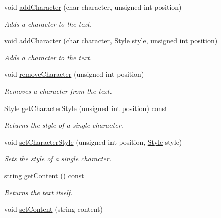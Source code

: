 \begin{CompactItemize}
void \hyperlink{class_text_8e2f98d018b51a0b800bb1189ad7d9ae}{addCharacter} (char character, unsigned int position)
\begin{CompactList}\small\item\em Adds a character to the text. \item\end{CompactList}\item 
void \hyperlink{class_text_a2074d216bde350970d9a4260c2d85bb}{addCharacter} (char character, \hyperlink{class_style}{Style} style, unsigned int position)
\begin{CompactList}\small\item\em Adds a character to the text. \item\end{CompactList}\item 
void \hyperlink{class_text_d62cf2b09042cfd169b8274ef3226fbd}{removeCharacter} (unsigned int position)
\begin{CompactList}\small\item\em Removes a character from the text. \item\end{CompactList}\item 
\hyperlink{class_style}{Style} \hyperlink{class_text_7fec452bd51b06b53fbb5abc9c335459}{getCharacterStyle} (unsigned int position) const 
\begin{CompactList}\small\item\em Returns the style of a single character. \item\end{CompactList}\item 
void \hyperlink{class_text_7cf2efca7fdd4d7b04292e373d5c2e5e}{setCharacterStyle} (unsigned int position, \hyperlink{class_style}{Style} style)
\begin{CompactList}\small\item\em Sets the style of a single character. \item\end{CompactList}\item 
string \hyperlink{class_text_b982578fcb4eda8f6cb49927600f859f}{getContent} () const 
\begin{CompactList}\small\item\em Returns the text itself. \item\end{CompactList}\item 
void \hyperlink{class_text_422e904d6f93e34741c28099fc5b077a}{setContent} (string content)

\end{CompactItemize}
